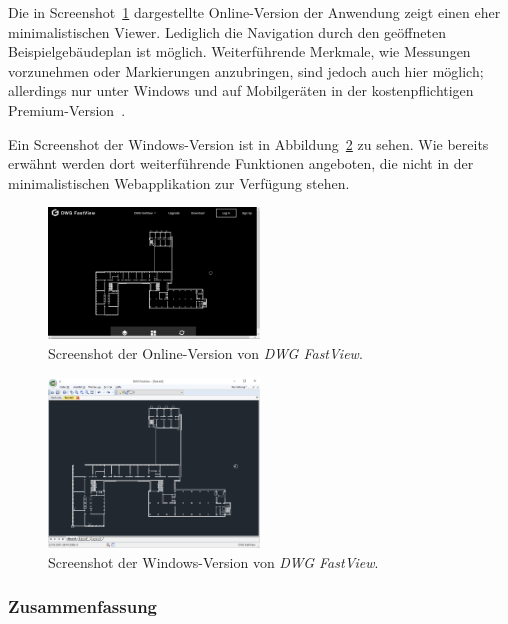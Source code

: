 Die in Screenshot~\ref{fig:dwg-fastview-online} dargestellte Online-Version der Anwendung zeigt einen eher minimalistischen Viewer.
Lediglich die Navigation durch den geöffneten Beispielgebäudeplan ist möglich.
Weiterführende Merkmale, wie Messungen vorzunehmen oder Markierungen anzubringen, sind jedoch auch hier möglich; allerdings nur unter Windows und auf Mobilgeräten in der kostenpflichtigen Premium-Version~\cite{DWGFastViewPremium}.

Ein Screenshot der Windows-Version ist in Abbildung~\ref{fig:dwg-fastview-windows} zu sehen.
Wie bereits erwähnt werden dort weiterführende Funktionen angeboten, die nicht in der minimalistischen Webapplikation zur Verfügung stehen.

\begin{figure}
    \includegraphics[width=0.5\textwidth]{res/dwg-fastview-online.png}
    \caption{Screenshot der Online-Version von \textit{DWG FastView}.}
    \label{fig:dwg-fastview-online}
\end{figure}

\begin{figure}
    \includegraphics[width=0.5\textwidth]{res/dwg-fastview.png}
    \caption{Screenshot der Windows-Version von \textit{DWG FastView}.}
    \label{fig:dwg-fastview-windows}
\end{figure}

\subsubsection{Zusammenfassung}
\label{subsubsec:cad-viewer-comparison-summary}

